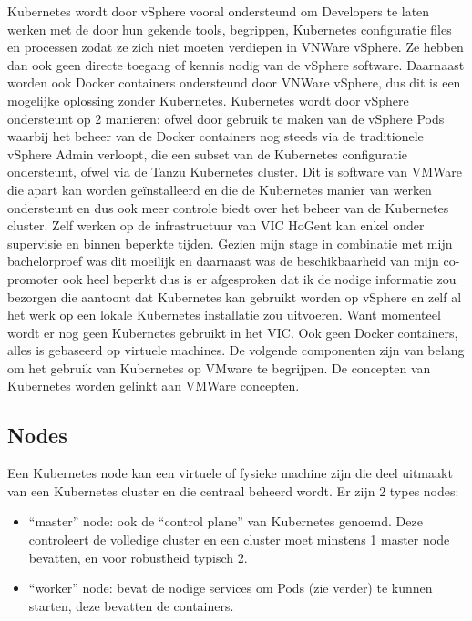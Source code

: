 \textcite{VMware2021}

\newline
\newline
Kubernetes wordt door vSphere vooral ondersteund om Developers te laten werken met de door hun gekende tools, begrippen, Kubernetes configuratie files en processen zodat ze zich niet moeten verdiepen in VNWare vSphere. Ze hebben dan ook geen directe toegang of kennis nodig van de vSphere software.\autocite{VMware2019}
\newline
\newline
Daarnaast worden ook Docker containers ondersteund door VNWare vSphere, dus dit is een mogelijke oplossing zonder Kubernetes.
\newline
\newline
Kubernetes wordt door vSphere ondersteunt op 2 manieren: ofwel door gebruik te maken van de vSphere Pods waarbij het beheer van de Docker containers nog steeds via de traditionele vSphere Admin verloopt, die een subset van de Kubernetes configuratie ondersteunt, ofwel via de Tanzu Kubernetes cluster. Dit is software van VMWare die apart kan worden geïnstalleerd en die de Kubernetes manier van werken ondersteunt en dus ook meer controle biedt over het beheer van de Kubernetes cluster.
\newline
\newline
Zelf werken op de infrastructuur van VIC HoGent kan enkel onder supervisie en binnen beperkte tijden. Gezien mijn stage in combinatie met mijn bachelorproef was dit moeilijk en daarnaast was de beschikbaarheid van mijn co-promoter ook heel beperkt dus is er afgesproken dat ik de nodige informatie zou bezorgen die aantoont dat Kubernetes kan gebruikt worden op vSphere en zelf al het werk op een lokale Kubernetes installatie zou uitvoeren. Want momenteel wordt er nog geen Kubernetes gebruikt in het VIC. Ook geen Docker containers, alles is gebaseerd op virtuele machines. 
\newline
\newline
De volgende componenten zijn van belang om het gebruik van Kubernetes op VMware te begrijpen. De concepten van Kubernetes worden gelinkt aan VMWare concepten.
\newline
\newline
\subsection{Nodes}
Een Kubernetes node kan een virtuele of fysieke machine zijn die deel uitmaakt van een Kubernetes cluster en die centraal beheerd wordt.
Er zijn 2 types nodes:
\begin{itemize}
    \item ``master'' node: ook de ``control plane'' van Kubernetes genoemd. Deze controleert de volledige cluster en een cluster moet minstens 1 master node bevatten, en voor robustheid typisch 2.
    \item ``worker'' node: bevat de nodige services om Pods (zie verder) te kunnen starten, deze bevatten de containers.
\end{itemize}
\textcite{NirShtein2023}
\newline
\newline
